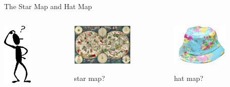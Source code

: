 \begin{frame}[fragile,label=P5Lemma]{The Star Map and Hat Map}
  \begin{columns}
    \begin{column}{0.3\textwidth}
      \hskip1cm \includegraphics[height=3cm]{inputs/amconfus.png}
    \end{column}
    \begin{column}{0.3\textwidth}
      \includegraphics[height=2cm]{inputs/starchart}
      \begin{center}star map?\end{center}
    \end{column}
    \begin{column}{0.3\textwidth}
      \includegraphics[height=2cm]{inputs/maphat.jpg}
      \begin{center}hat map?\end{center}
    \end{column}
  \end{columns}
\end{frame}


